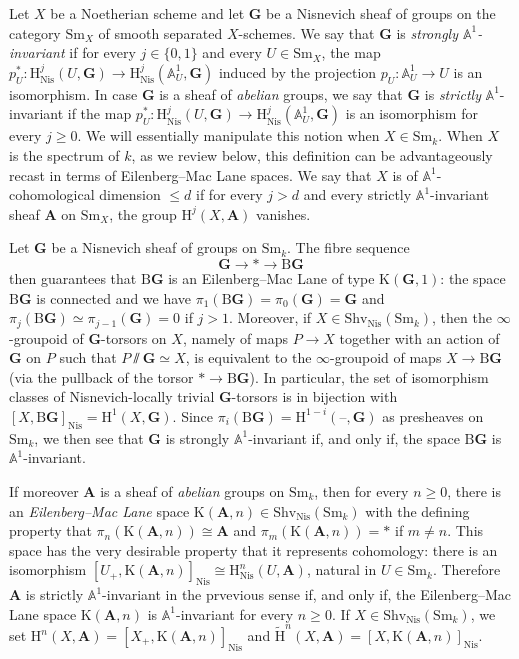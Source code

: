 \documentclass[11pt,leqno]{amsart}
\renewcommand{\1}{{\rm 1\hspace*{-0.4ex}%
\rule{0.1ex}{1.52ex}\hspace*{0.2ex}}}
\newcommand{\Nis}{{\operatorname{Nis}}}
\newcommand{\Shv}{{\mathrm{Shv}}}
\newcommand{\Sm}{\mathrm{Sm}}
\newcommand{\Hr}{{\mathrm {H}}}
\newcommand{\<}[1]{{\langle}#1 {\rangle}}
\newcommand{\Kr}{\mathrm{K}}
\newcommand{\Abf}{\mathbf{A}}
\newcommand{\Abb}{\mathbb{A}}
\newcommand{\Gbf}{\mathbf{G}}
\newcommand{\Br}{\mathrm{B}}
\theoremstyle{plain}
\theoremstyle{definition}
\theoremstyle{remark}
\numberwithin{equation}{section}
\begin{document}
Let $X$ be a Noetherian scheme and let $\Gbf$ be a Nisnevich sheaf of groups on the category $\Sm_X$ of smooth separated $X$-schemes. We say that $\Gbf$ is \emph{strongly $\Abb^1$-invariant} if for every $j\in\{0,1\}$ and every $U\in\Sm_X$, the map $p_U^*:\Hr_\Nis^j(U,\Gbf)\to\Hr_\Nis^j(\Abb_U^1,\Gbf)$ induced by the projection $p_U:\Abb_U^1\to U$ is an isomorphism. In case $\Gbf$ is a sheaf of \emph{abelian} groups, we say that $\Gbf$ is \emph{strictly} $\Abb^1$-invariant if the map $p_U^*:\Hr_\Nis^j(U,\Gbf)\to\Hr_\Nis^j(\Abb_U^1,\Gbf)$ is an isomorphism for every $j\geq 0$. We will essentially manipulate this notion when $X\in\Sm_k$. When $X$ is the spectrum of $k$, as we review below, this definition can be advantageously recast in terms of Eilenberg--Mac Lane spaces. We say that $X$ is of $\Abb^1$-cohomological dimension $\leq d$ if for every $j>d$ and every strictly $\Abb^1$-invariant sheaf $\Abf$ on $\Sm_X$, the group $\Hr^j(X,\Abf)$ vanishes.

Let $\Gbf$ be a Nisnevich sheaf of groups on $\Sm_k$. The fibre sequence \[\Gbf\rightarrow *\rightarrow\Br\Gbf\] then guarantees that $\Br\Gbf$ is an Eilenberg--Mac Lane of type $\Kr(\Gbf,1)$: the space $\Br\Gbf$ is connected and we have $\pi_1(\Br\Gbf)=\pi_0(\Gbf)=\Gbf$ and $\pi_j(\Br\Gbf)\simeq\pi_{j-1}(\Gbf)=0$ if $j>1$. Moreover, if $X\in\Shv_\Nis(\Sm_k)$, then the $\infty$-groupoid of $\Gbf$-torsors on $X$, namely of maps $P\rightarrow X$ together with an action of $\Gbf$ on $P$ such that $P\sslash\Gbf\simeq X$, is equivalent to the $\infty$-groupoid of maps $X\rightarrow\Br\Gbf$ (via the pullback of the torsor $*\rightarrow\Br\Gbf$). In particular, the set of isomorphism classes of Nisnevich-locally trivial $\Gbf$-torsors is in bijection with $[X,\Br\Gbf]_{\Nis}=\Hr^1(X,\Gbf)$. Since $\pi_i(\Br\Gbf)=\Hr^{1-i}(\text{--},\Gbf)$ as presheaves on $\Sm_k$, we then see that $\Gbf$ is strongly $\Abb^1$-invariant if, and only if, the space $\Br\Gbf$ is $\Abb^1$-invariant.

If moreover $\Abf$ is a sheaf of \emph{abelian} groups on $\Sm_k$, then for every $n\geq 0$, there is an \emph{Eilenberg--Mac Lane} space $\Kr(\Abf,n)\in\Shv_\Nis(\Sm_k)$ with the defining property that $\pi_n(\Kr(\Abf,n))\cong\Abf$ and $\pi_m(\Kr(\Abf,n))=*$ if $m\neq n$. This space has the very desirable property that it represents cohomology: there is an isomorphism $[U_+,\Kr(\Abf,n)]_{\Nis}\cong\Hr_\Nis^n(U,\Abf)$, natural in $U\in\Sm_k$. Therefore $\Abf$ is strictly $\Abb^1$-invariant in the prvevious sense if, and only if, the Eilenberg--Mac Lane space $\Kr(\Abf,n)$ is $\Abb^1$-invariant for every $n\geq 0$. If $X\in\Shv_\Nis(\Sm_k)$, we set $\Hr^n(X,\Abf)=[X_+,\Kr(\Abf,n)]_{\Nis}$ and $\widetilde{\Hr}^n(X,\Abf)=[X,\Kr(\Abf,n)]_{\Nis}$.
\end{document}
